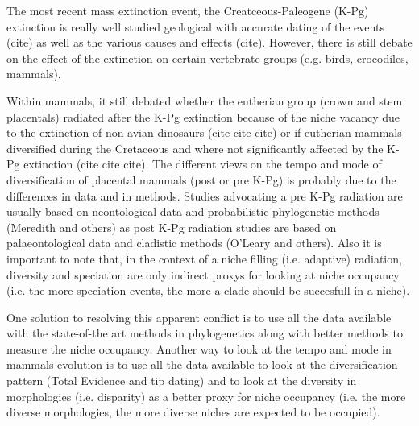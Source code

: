 \documentclass[12pt,letterpaper]{article}
\begin{document}
The most recent mass extinction event, the Creatceous-Paleogene (K-Pg) extinction is really well studied geological with accurate dating of the events (cite) as well as the various causes and effects (cite).
However, there is still debate on the effect of the extinction on certain vertebrate groups (e.g. birds, crocodiles, mammals).

Within mammals, it still debated whether the eutherian group (crown and stem placentals) radiated after the K-Pg extinction because of the niche vacancy due to the extinction of non-avian dinosaurs (cite cite cite) or if eutherian mammals diversified during the Cretaceous and where not significantly affected by the K-Pg extinction (cite cite cite).
The different views on the tempo and mode of diversification of placental mammals (post or pre K-Pg) is probably due to the differences in data and in methods. Studies advocating a pre K-Pg radiation are usually based on neontological data and probabilistic phylogenetic methods (Meredith and others) as post K-Pg radiation studies are based on palaeontological data and cladistic methods (O'Leary and others). Also it is important to note that, in the context of a niche filling (i.e. adaptive) radiation, diversity and speciation are only indirect proxys for looking at niche occupancy (i.e. the more speciation events, the more a clade should be succesfull in a niche).

One solution to resolving this apparent conflict is to use all the data available with the state-of-the art methods in phylogenetics along with better methods to measure the niche occupancy.
Another way to look at the tempo and mode in mammals evolution is to use all the data available to look at the diversification pattern (Total Evidence and tip dating) and to look at the diversity in morphologies (i.e. disparity) as a better proxy for niche occupancy (i.e. the more diverse morphologies, the more diverse niches are expected to be occupied).
\end{document}

